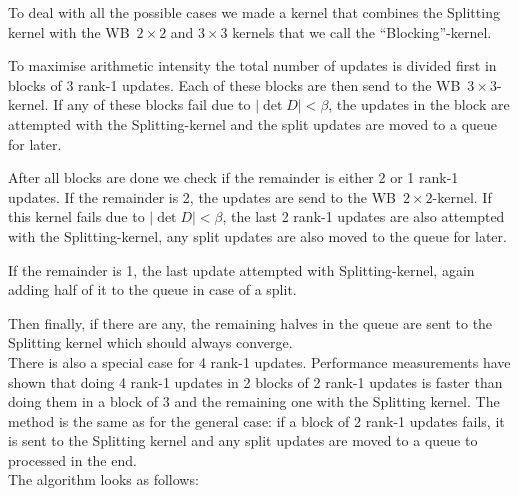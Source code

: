 \documentclass[11pt]{article}
\numberwithin{figure}{section}
\numberwithin{table}{section}
\begin{document}
				To deal with all the possible cases we made a kernel that combines the Splitting kernel with the WB~$2\times 2$ and $3\times 3$ kernels that we call the ``Blocking''-kernel.
				
				To maximise arithmetic intensity the total number of updates is divided first in blocks of 3 rank-1 updates. Each of these blocks are then send to the  WB~$3\times 3$-kernel. If any of these blocks fail due to $\left|\det D\right|<\beta$, the updates in the block are attempted with the Splitting-kernel and the split updates are moved to a queue for later.
				
				After all blocks are done we check if the remainder is either 2 or 1 rank-1 updates. If the remainder is 2, the updates are send to the WB~$2\times 2$-kernel. If this kernel fails due to $\left|\det D\right|<\beta$, the last 2 rank-1 updates are also attempted with the Splitting-kernel, any split updates are also moved to the queue for later.
				
				If the remainder is 1, the last update attempted with Splitting-kernel, again adding half of it to the queue in case of a split.
				
				Then finally, if there are any, the remaining halves in the queue are sent to the Splitting kernel which should always converge.\\
				
				There is also a special case for 4 rank-1 updates. Performance measurements have shown that doing 4 rank-1 updates in 2 blocks of 2 rank-1 updates is faster than doing them in a block of 3 and the remaining one with the Splitting kernel. The method is the same as for the general case: if a block of 2 rank-1 updates fails, it is sent to the Splitting kernel and any split updates are moved to a queue to processed in the end.\\
				
				The algorithm looks as follows:\\
				
\end{document}

